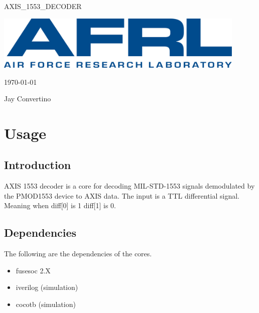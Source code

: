 \begin{titlepage}
  \begin{center}

  {\Huge AXIS\_1553\_DECODER}

  \vspace{25mm}

  \includegraphics[width=0.90\textwidth,height=\textheight,keepaspectratio]{img/AFRL.png}

  \vspace{25mm}

  \today

  \vspace{15mm}

  {\Large Jay Convertino}

  \end{center}
\end{titlepage}

\tableofcontents

\newpage

\section{Usage}

\subsection{Introduction}

\par
AXIS 1553 decoder is a core for decoding MIL-STD-1553 signals demodulated by the PMOD1553 device to AXIS data.
The input is a TTL differential signal. Meaning when diff[0] is 1 diff[1] is 0.

\subsection{Dependencies}

\par
The following are the dependencies of the cores.

\begin{itemize}
  \item fusesoc 2.X
  \item iverilog (simulation)
  \item cocotb (simulation)
\end{itemize}

